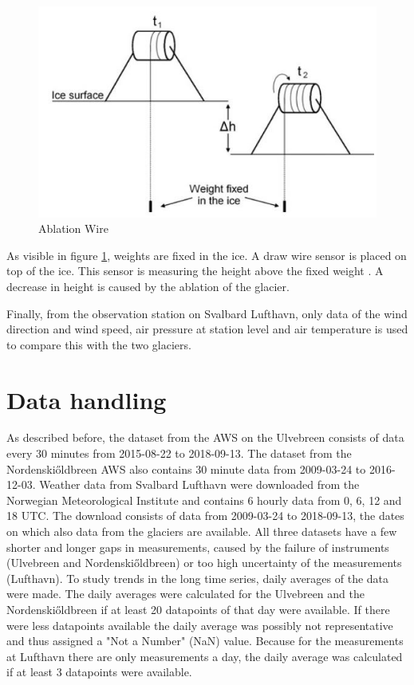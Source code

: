 \documentclass[11pt]{report}
\begin{document}
\begin{figure}[h]
\raggedright
\begin{minipage}{0.65\textwidth}
\raggedright
    \includegraphics[scale=1, width=1\textwidth]{abliationwire.jpg}	 
    \caption{Ablation Wire \cite{abl}}
    \label{fig:ablation}
\end{minipage}%
\end{figure}

As visible in figure \ref{fig:ablation}, weights are fixed in the ice. A draw wire sensor is placed on top of the ice. This sensor is measuring the height above the fixed weight \cite{abl}. A decrease in height is caused by the ablation of the glacier.

Finally, from the observation station on Svalbard Lufthavn, only data of the wind direction and wind speed, air pressure at station level and air temperature is used to compare this with the two glaciers.

\newpage
\section{Data handling}\label{sec:datah}
As described before, the dataset from the AWS on the Ulvebreen consists of data every 30 minutes from 2015-08-22 to 2018-09-13. The dataset from the Nordenski\H{o}ldbreen AWS also contains 30 minute data from 2009-03-24 to 2016-12-03. Weather data from Svalbard Lufthavn were downloaded from the Norwegian Meteorological Institute \cite{sharkii} and contains 6 hourly data from 0, 6, 12 and 18 UTC. The download consists of data from 2009-03-24 to 2018-09-13, the dates on which also data from the glaciers are available. All three datasets have a few shorter and longer gaps in measurements, caused by the failure of instruments (Ulvebreen and Nordenski\H{o}ldbreen) or too high uncertainty of the measurements (Lufthavn). To study trends in the long time series, daily averages of the data were made. The daily averages were calculated for the Ulvebreen and the Nordenski\H{o}ldbreen if at least 20 datapoints of that day were available. If there were less datapoints available the daily average was possibly not representative and thus assigned a "Not a Number"  (NaN) value. Because for the measurements at Lufthavn there are only measurements a day, the daily average was calculated if at least 3 datapoints were available. 
\end{document}
